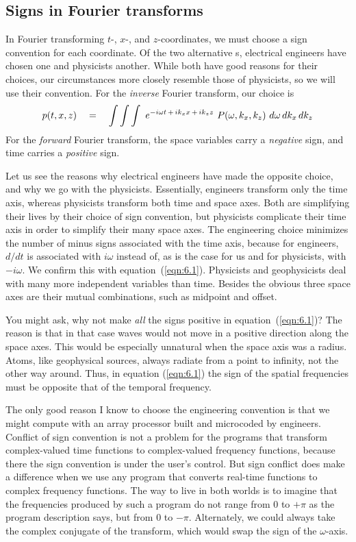\subsection{Signs in Fourier transforms}
\par
\label{'sign convention'}
In Fourier transforming  $t$-, $x$-, and $z$-coordinates,
we must choose
a sign convention for each coordinate.
Of the two alternative s,
electrical engineers have chosen one and physicists another.
While both have good reasons for their choices,
our circumstances more closely resemble those of physicists,
so we will use their convention.
For the {\em  inverse} Fourier transform, our choice is
\begin{equation}
p(t,x,z) \quad =\quad \int \int \int \ e^{ -i \omega t \,+\, ik_x x \,+\, ik_z z}
\ P ( \omega , k_x , k_z ) \ d  \omega \,  dk_x \, dk_z
\label{eqn:6.1}
\end{equation}
For the {\em  forward} Fourier transform,
the space variables carry a {\em  negative} sign, and
time carries a {\em  positive} sign.
\par
Let us see the reasons why electrical engineers have made
the opposite choice,
and why we go with the physicists.
Essentially, engineers transform only the time axis,
whereas physicists transform both time and space axes.
Both are simplifying their lives by their choice
of sign convention,
but physicists complicate their time axis
in order to simplify
their many space axes.
The engineering choice minimizes the number of minus signs
associated with the time axis, because for engineers,
$d/dt$ is associated with $i\omega$ instead of,
as is the case for us and for physicists,
with $-i\omega$.
We confirm this with equation~(\ref{eqn:6.1}).
Physicists and geophysicists deal with many more independent variables
than time.
Besides the obvious three space axes
are their mutual combinations, such as midpoint and offset.
\par
You might ask,
why not make {\em  all} the signs positive in equation~(\ref{eqn:6.1})?
The reason is that in that case
waves would not move in a positive direction along the space axes.
This would be especially unnatural when the space axis was a radius.
Atoms, like geophysical sources,
always radiate from a point to infinity,
not the other way around.
Thus, in equation (\ref{eqn:6.1}) the sign of the spatial frequencies
must be opposite that of the temporal frequency.
\par
The only good reason I know to choose the
engineering convention
is that we might compute with an
array processor built and microcoded by engineers.
Conflict of sign convention is not a problem
for the programs that transform complex-valued 
time functions to complex-valued frequency functions,
because there the sign convention is under the user's control.
But sign conflict does make a difference when we use any program
that converts real-time functions to complex frequency functions.
The way to live in both worlds is to imagine
that the frequencies produced by such a program
do not range from  $0$  to  $+ \pi$  as
the program description says, but from  $0$  to  $- \pi$.
Alternately, we could always take the complex conjugate of the transform,
which would swap the sign of the $\omega$-axis.
